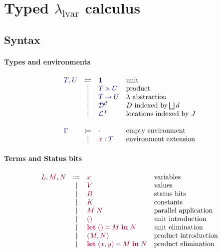 \documentclass[main.tex]{subfiles}
\begin{document}
\section{Typed $\lambda_{\text{lvar}}$ calculus}

\subsection{Syntax}
\label{sec:llam-syntax}

\paragraph{Types and environments}
\[
\begin{array}{lcll}
  \ty{T}, \ty{U}
  & \coloneqq & \ty{\tyunit}        & \text{unit} \\
  & \sep      & \ty{\typrod{T}{U}}  & \text{product} \\
  & \sep      & \ty{\tyfun{T}{U}}   & \lambda \text{ abstraction}\\
  & \sep      & \ty{\tyD{d}}        & D \text{ indexed by} \bigsqcup d \\
  & \sep      & \ty{\tyL{J}}        & \text{locations indexed by } J \\
  \\
  \ty{\Gamma}
  & \coloneqq & \ty{\emptyenv}                 & \text{empty environment}\\
  & \sep      & \ty{\tmty{x}{T}}               & \text{environment extension} \\
\end{array}
\]

\paragraph{Terms and Status bits}
\[
\begin{array}{lcll}
  \tm{L}, \tm{M}, \tm{N}
  & \coloneqq & \tm{x}                        & \text{variables} \\
  & \sep      & \tm{V}                        & \text{values} \\
  & \sep      & \tm{B}                        & \text{status bits}\\
  & \sep      & \tm{K}                        & \text{constants} \\                                              
  & \sep      & \tm{M\;N}                     & \text{parallel application} \\
  & \sep      & \tm{\unit}                    & \text{unit introduction} \\
  & \sep      & \tm{\letunit{M}{N}}           & \text{unit elimination} \\
  & \sep      & \tm{\pair{M}{N}}              & \text{product introduction} \\
  & \sep      & \tm{\letpair{x}{y}{M}{N}}     & \text{product elimination}\\
\end{array}
\]
\end{document}
